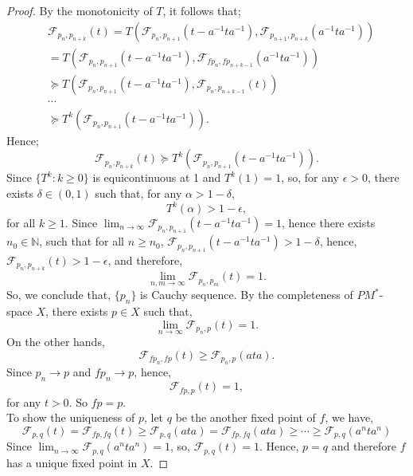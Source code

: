 \documentclass{amsart}%
\theoremstyle{plain}
\numberwithin{equation}{section}
\begin{document}
\begin{proof}
	By the monotonicity of $T$, it follows that;
	\begin{align*}
		&\mathcal{F}_{p_{n},p_{n+k}}(t)=T\left( \mathcal{F}_{p_{n},p_{n+1}}(t-a^{-1}ta^{-1}), \mathcal{F}_{p_{n+1},p_{n+k}}(a^{-1}ta^{-1})\right) \\
		&=T\left( \mathcal{F}_{p_{n},p_{n+1}}(t-a^{-1}ta^{-1}), \mathcal{F}_{fp_{n},fp_{n+k-1}}(a^{-1}ta^{-1})\right) \\
		& \succeq T\left( \mathcal{F}_{p_{n},p_{n+1}}(t-a^{-1}ta^{-1}), \mathcal{F}_{p_{n},p_{n+k-1}}(t)\right) \\
		&\cdots\\
		& \succeq T^k\left( \mathcal{F}_{p_{n},p_{n+1}}(t-a^{-1}ta^{-1})\right).
	\end{align*}
	Hence;
	$$\mathcal{F}_{p_{n},p_{n+k}}(t)\succeq T^k\left( \mathcal{F}_{p_{n},p_{n+1}}(t-a^{-1}ta^{-1})\right).$$
	Since $\{T^k: k\geq0\}$ is equicontinuous at 1 and $T^k(1)=1$, so, for any $\epsilon>0$, there exists $\delta \in (0,1)$ such that, for any $\alpha> 1-\delta$,
	$$T^k(\alpha)>1-\epsilon,$$
	for all $k\geq 1$. Since $\lim_{n\to\infty}\mathcal{F}_{p_{n},p_{n+1}}(t-a^{-1}ta^{-1})=1$, hence there exists $n_0\in \mathbb{N}$, such that for all $n\geq n_0$, 
	$\mathcal{F}_{p_{n},p_{n+1}}(t-a^{-1}ta^{-1})>1-\delta$, hence, $\mathcal{F}_{p_{n},p_{n+k}}(t)>1-\epsilon$, and therefore,
	$$\lim_{n,m\to \infty}\mathcal{F}_{p_{n},p_{m}}(t)=1.$$
	So, we conclude that, $\{p_n\}$ is Cauchy sequence. By the completeness of $PM^*$-space $X$, there exists $p\in X$ such that, 
	$$\lim_{n\to \infty}\mathcal{F}_{p_{n},p}(t)=1.$$
	On the other hands,
	$$\mathcal{F}_{f{p_n},fp }(t)\geq \mathcal{F}_{p_n,p}(ata).$$
	Since $p_n\to p$ and $f{p_n}\to p$, hence,
	$$\mathcal{F}_{fp,p}(t)=1,$$
	for any $t>0$. So $fp=p$.\\
	To show the uniqueness of $p$, let $q$ be the another fixed point of $f$, we have, 
	$$\mathcal{F}_{p,q}(t)=\mathcal{F}_{fp,fq}(t)\geq\mathcal{F}_{p,q}(ata)= \mathcal{F}_{fp,fq}(ata)\geq \cdots \geq \mathcal{F}_{p,q}(a^nta^n)$$
	Since $\lim_{n\to \infty}\mathcal{F}_{p,q}(a^nta^n)=1$, so, $\mathcal{F}_{p,q}(t)=1$. Hence, $p=q$ and therefore $f$ has a unique fixed point in $X$.
\end{proof}
\end{document}
